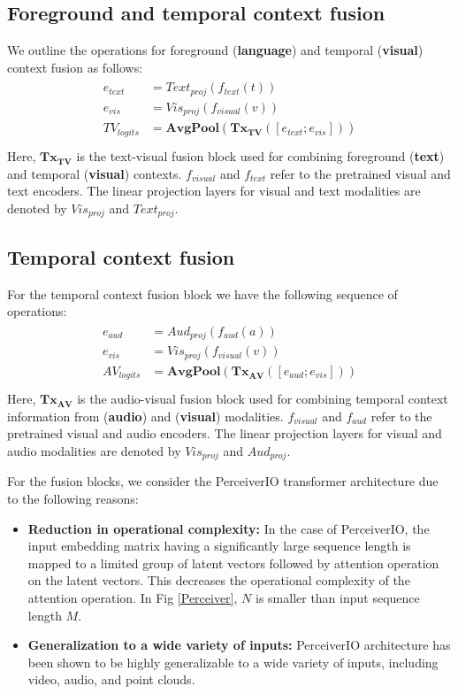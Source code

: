 \subsection{Foreground and temporal context fusion}
We outline the operations for foreground (\textbf{language}) and temporal (\textbf{visual}) context fusion as follows:
 \begin{align}
    \begin{split}
     e_{text}&=Text_{proj}(f_{text}(t))\\
     e_{vis}&=Vis_{proj}(f_{visual}(v)) \\ 
     TV_{logits}&=\mathbf{AvgPool}(\mathbf{{Tx}_{TV}}([e_{text};e_{vis}])) \\
    \end{split}
 \end{align}
 Here, $\mathbf{{Tx}_{TV}}$ is the text-visual fusion block used for combining foreground (\textbf{text}) and temporal (\textbf{visual}) contexts. $f_{visual}$ and $f_{text}$ refer to the pretrained visual and text encoders. The linear projection layers for visual and text modalities are denoted by $Vis_{proj}$ and $Text_{proj}$. 

\subsection{Temporal context fusion}
For the temporal context fusion block we have the following sequence of operations:
\begin{align}
    \begin{split}
     e_{aud}&=Aud_{proj}(f_{aud}(a))\\
     e_{vis}&=Vis_{proj}(f_{visual}(v)) \\ 
     AV_{logits}&=\mathbf{AvgPool}(\mathbf{{Tx}_{AV}}([e_{aud};e_{vis}])) \\
    \end{split}
\end{align}
 Here, $\mathbf{{Tx}_{AV}}$ is the audio-visual fusion block used for combining temporal context information from (\textbf{audio}) and   (\textbf{visual}) modalities. $f_{visual}$ and $f_{aud}$ refer to the pretrained visual and audio encoders. The linear projection layers for visual and audio modalities are denoted by $Vis_{proj}$ and $Aud_{proj}$. 

 For the fusion blocks, we consider the PerceiverIO transformer architecture \cite{Jaegle2021PerceiverIA} due to the following reasons:

 \begin{itemize}
    \item \textbf{Reduction in operational complexity:} In the case of PerceiverIO, the input embedding matrix having a significantly large sequence length is mapped to a limited group of latent vectors followed by attention operation on the latent vectors. This decreases the operational complexity of the attention operation. In Fig \ref{Perceiver}, $N$ is smaller than input sequence length $M$.
    \item \textbf{Generalization to a wide variety of inputs:} PerceiverIO architecture has been shown to be highly generalizable to a wide variety of inputs, including video, audio, and point clouds.
 \end{itemize}

